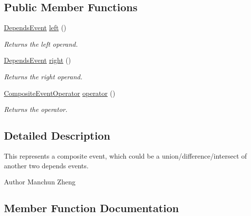 \subsection*{Public Member Functions}
\begin{DoxyCompactItemize}
\item 
\hyperlink{interfaceedu_1_1udel_1_1cis_1_1vsl_1_1civl_1_1model_1_1IF_1_1contract_1_1DependsEvent}{Depends\+Event} \hyperlink{interfaceedu_1_1udel_1_1cis_1_1vsl_1_1civl_1_1model_1_1IF_1_1contract_1_1CompositeEvent_a53cd18ef57b242dd9b68d0137477c0f1}{left} ()
\begin{DoxyCompactList}\small\item\em Returns the left operand. \end{DoxyCompactList}\item 
\hyperlink{interfaceedu_1_1udel_1_1cis_1_1vsl_1_1civl_1_1model_1_1IF_1_1contract_1_1DependsEvent}{Depends\+Event} \hyperlink{interfaceedu_1_1udel_1_1cis_1_1vsl_1_1civl_1_1model_1_1IF_1_1contract_1_1CompositeEvent_a81d44e756f9eadf56708487b7076ddfe}{right} ()
\begin{DoxyCompactList}\small\item\em Returns the right operand. \end{DoxyCompactList}\item 
\hyperlink{enumedu_1_1udel_1_1cis_1_1vsl_1_1civl_1_1model_1_1IF_1_1contract_1_1CompositeEvent_1_1CompositeEventOperator}{Composite\+Event\+Operator} \hyperlink{interfaceedu_1_1udel_1_1cis_1_1vsl_1_1civl_1_1model_1_1IF_1_1contract_1_1CompositeEvent_afe0ec70353785bcb53dd2dba3c5eb1be}{operator} ()
\begin{DoxyCompactList}\small\item\em Returns the operator. \end{DoxyCompactList}\end{DoxyCompactItemize}


\subsection{Detailed Description}
This represents a composite event, which could be a union/difference/intersect of another two depends events. 

\begin{DoxyAuthor}{Author}
Manchun Zheng 
\end{DoxyAuthor}


\subsection{Member Function Documentation}
\hypertarget{interfaceedu_1_1udel_1_1cis_1_1vsl_1_1civl_1_1model_1_1IF_1_1contract_1_1CompositeEvent_a53cd18ef57b242dd9b68d0137477c0f1}{}
